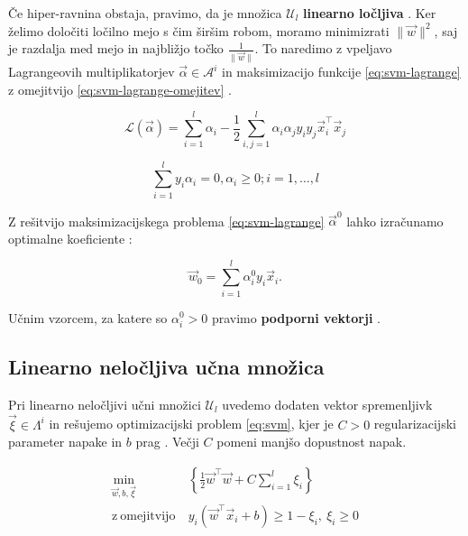 Če hiper-ravnina obstaja, pravimo, da je množica $\mathcal{U}_l$ \textbf{linearno ločljiva} \cite{chapelle1999support}. Ker želimo določiti ločilno mejo s čim širšim robom, moramo minimizrati $\|\vec{w}\|^2$, saj je razdalja med mejo in najbližjo točko $\frac{1}{\|\vec{w}\|}$. To naredimo z vpeljavo Lagrangeovih multiplikatorjev $\vec{\alpha} \in \mathcal{A}^i$ in maksimizacijo funkcije \eqref{eq:svm-lagrange} z omejitvijo \eqref{eq:svm-lagrange-omejitev} \cite{chapelle1999support}.

\begin{equation}\label{eq:svm-lagrange}
	\mathcal{L}(\vec{\alpha}) = \sum_{i=1}^l \alpha_i - \frac{1}{2}\sum_{i,j=1}^l \alpha_i\alpha_j y_i y_j \vec{x}_i^\top\vec{x}_j
\end{equation}

\begin{equation}\label{eq:svm-lagrange-omejitev}
	\sum_{i=1}^ly_i\alpha_i = 0, \alpha_i \geq 0; i=1, \ldots, l
\end{equation}

Z rešitvijo maksimizacijskega problema \eqref{eq:svm-lagrange} $\vec{\alpha}^0$ lahko izračunamo optimalne koeficiente \cite{chapelle1999support}:

\begin{equation}
	\vec{w}_0 = \sum_{i=1}^l \alpha_i^0 y_i \vec{x}_i.
\end{equation}

Učnim vzorcem, za katere so $\alpha_i^0 > 0$ pravimo \textbf{podporni vektorji} \cite{chapelle1999support}.









\subsection{Linearno neločljiva učna množica}
Pri linearno neločljivi učni množici $\mathcal{U}_l$ uvedemo dodaten vektor spremenljivk $\vec{\xi} \in \mathit{\Lambda}^i$ in rešujemo optimizacijski problem \eqref{eq:svm}, kjer je $C>0$ regularizacijski parameter napake in $b$ prag \cite{chapelle1999support}. Večji $C$ pomeni manjšo dopustnost napak. 

\begin{equation}\label{eq:svm}
\begin{aligned}
\min_{\vec{w}, b, \vec{\xi}} &~ \left\{ \frac{1}{2} \vec{w}^\top\vec{w} + C \sum_{i=1}^l\xi_i \right\}\\
    \mathrm{z~omejitvijo} &~ y_i \left( \vec{w}^\top \vec{x}_i + b \right) \geq 1 - \xi_i,~ 
    \xi_i \geq 0
\end{aligned}	
\end{equation}








